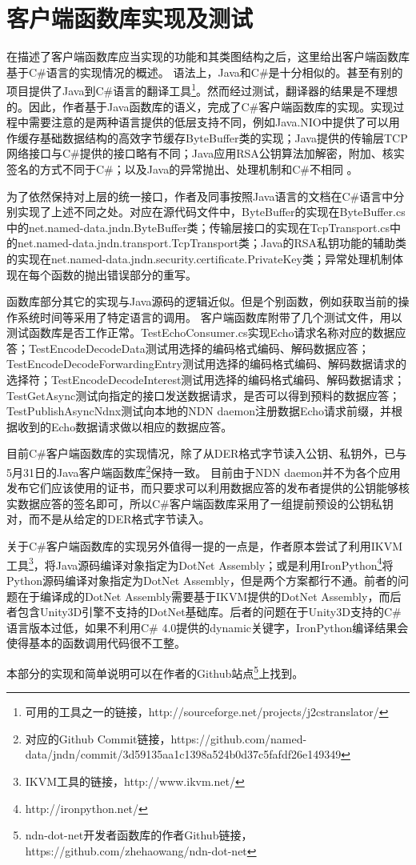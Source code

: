 \section{客户端函数库实现及测试}
\par
在描述了客户端函数库应当实现的功能和其类图结构之后，这里给出客户端函数库基于C\#语言的实现情况的概述。
语法上，Java和C\#是十分相似的。甚至有别的项目提供了Java到C\#语言的翻译工具\footnote{可用的工具之一的链接，http://sourceforge.net/projects/j2cstranslator/}。然而经过测试，翻译器的结果是不理想的。因此，作者基于Java函数库的语义，完成了C\#客户端函数库的实现。实现过程中需要注意的是两种语言提供的低层支持不同，例如Java.NIO中提供了可以用作缓存基础数据结构的高效字节缓存ByteBuffer类的实现；Java提供的传输层TCP网络接口与C\#提供的接口略有不同；Java应用RSA公钥算法加解密，附加、核实签名的方式不同于C\#；以及Java的异常抛出、处理机制和C\#不相同 。
\par
为了依然保持对上层的统一接口，作者及同事按照Java语言的文档在C\#语言中分别实现了上述不同之处。对应在源代码文件中，ByteBuffer的实现在ByteBuffer.cs中的net.named-data.jndn.ByteBuffer类；传输层接口的实现在TcpTransport.cs中的net.named-data.jndn.transport.TcpTransport类；Java的RSA私钥功能的辅助类的实现在net.named-data.jndn.security.certificate.PrivateKey类；异常处理机制体现在每个函数的抛出错误部分的重写。
\par
函数库部分其它的实现与Java源码的逻辑近似。但是个别函数，例如获取当前的操作系统时间等采用了特定语言的调用。
客户端函数库附带了几个测试文件，用以测试函数库是否工作正常。TestEchoConsumer.cs实现Echo请求名称对应的数据应答；TestEncodeDecodeData测试用选择的编码格式编码、解码数据应答；TestEncodeDecodeForwardingEntry测试用选择的编码格式编码、解码数据请求的选择符；TestEncodeDecodeInterest测试用选择的编码格式编码、解码数据请求；TestGetAsync测试向指定的接口发送数据请求，是否可以得到预料的数据应答；TestPublishAsyncNdnx测试向本地的NDN daemon注册数据Echo请求前缀，并根据收到的Echo数据请求做以相应的数据应答。
\par
目前C\#客户端函数库的实现情况，除了从DER格式字节读入公钥、私钥外，已与5月31日的Java客户端函数库\footnote{对应的Github Commit链接，https://github.com/named-data/jndn/commit/3d59135aa1c1398a524b0d37c5fafdf26e149349}保持一致。 目前由于NDN daemon并不为各个应用发布它们应该使用的证书，而只要求可以利用数据应答的发布者提供的公钥能够核实数据应答的签名即可，所以C\#客户端函数库采用了一组提前预设的公钥私钥对，而不是从给定的DER格式字节读入。
\par
关于C\#客户端函数库的实现另外值得一提的一点是，作者原本尝试了利用IKVM工具\footnote{IKVM工具的链接，http://www.ikvm.net/}，将Java源码编译对象指定为DotNet Assembly；或是利用IronPython\footnote{http://ironpython.net/}将Python源码编译对象指定为DotNet Assembly，但是两个方案都行不通。前者的问题在于编译成的DotNet Assembly需要基于IKVM提供的DotNet Assembly，而后者包含Unity3D引擎不支持的DotNet基础库。后者的问题在于Unity3D支持的C\#语言版本过低，如果不利用C\# 4.0提供的dynamic关键字，IronPython编译结果会使得基本的函数调用代码很不工整。
\par
本部分的实现和简单说明可以在作者的Github站点\footnote{ndn-dot-net开发者函数库的作者Github链接，https://github.com/zhehaowang/ndn-dot-net}上找到。
